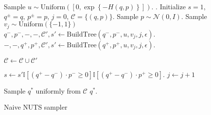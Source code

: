 \begin{figure}[H]
	\begin{algorithm}[H]
	\caption{Naive NUTS sampler}\label{algo:nuts_naive}
	\begin{algorithmic}
            \State Sample $u \sim \text{Uniform}\left(\left[0, \exp\left\{ -H(q, p) \right\}\right]\right)$. .
            \State Initialize $s = 1$, $q^\pm = q$, $p^\pm = p$, $j = 0$, $\mathcal{C} = \{(q, p)\}$.
            \State Sample $p \sim \mathcal{N}(0, I)$. 
                \State Sample $v_j \sim \text{Uniform}(\{-1, 1\})$ 
                    \State $q^-, p^-, -, -, \mathcal{C}', s' \leftarrow \text{BuildTree} (q^-, p^-, u, v_j, j, \epsilon)$.
                \Else
                    \State $-, -, q^+, p^+, \mathcal{C}', s' \leftarrow \text{BuildTree} (q^+, p^+, u, v_j, j, \epsilon)$.
                \EndIf
                
                    \State $\mathcal{C} \leftarrow \mathcal{C} \cup \mathcal{C}'$  
                \EndIf

                \State $s \leftarrow s' \mathbb{I}[(q^+ - q^-)\cdot p^- \geq 0]\mathbb{I}[(q^+ - q^-)\cdot p^+ \geq 0]$. 
                \State $j \leftarrow j + 1$ 

            \EndWhile
            \State Sample $q^*$ uniformly from $\mathcal{C}$
            \State \Return $q^*$.
        \EndProcedure
	\end{algorithmic}
	\end{algorithm}
\end{figure}


